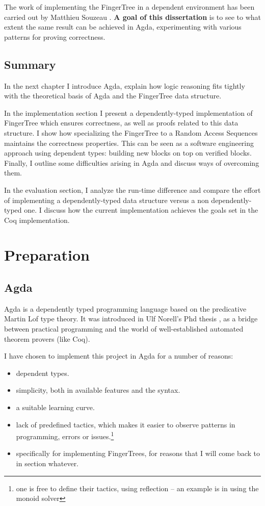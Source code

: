 \documentclass[12pt,twoside,notitlepage]{report}
\begin{document}
The work of implementing the FingerTree in a dependent environment has been carried out by Matthieu Souzeau \cite{coq}. \textbf{A goal of this dissertation} is to see to what extent the same result can be achieved in Agda, experimenting with various patterns for proving correctness.


\section{Summary}

In the next chapter I introduce Agda, explain how logic reasoning fits tightly with the theoretical basis of Agda and the FingerTree data structure. 

In the implementation section I present a dependently-typed implementation of FingerTree which ensures correctness, as well as proofs related to this data structure. I show how specializing the FingerTree to a Random Access Sequences maintains the correctness properties. This can be seen as a software engineering approach using dependent types: building new blocks on top on verified blocks. 
Finally, I outline some difficulties arising in Agda and discuss ways of overcoming them.

In the evaluation section, I analyze the run-time difference and compare the effort of implementing a dependently-typed data structure versus a non dependently-typed one. I discuss how the current implementation achieves the goals set in the Coq implementation.
 
\chapter{Preparation}

\section{Agda}

Agda\cite{agdatutorial} is a dependently typed programming language based on the predicative Martin Lof type theory. It was introduced in Ulf Norell’s Phd thesis \cite{agdaphd}, as a bridge between practical programming and the world of well-established automated theorem provers (like Coq). 

I have chosen to implement this project in Agda for a number of reasons: 
\begin{itemize}

\item dependent types.
\item simplicity, both in available features and the syntax.
\item a suitable learning curve.
\item lack of predefined tactics, which makes it easier to observe patterns in programming, errors or issues.\footnote{one is free to define their tactics, using reflection  – an example is in using the monoid solver}
\item specifically for implementing FingerTrees, for reasons that I will come back to in section whatever.
\end{itemize}
\end{document}
